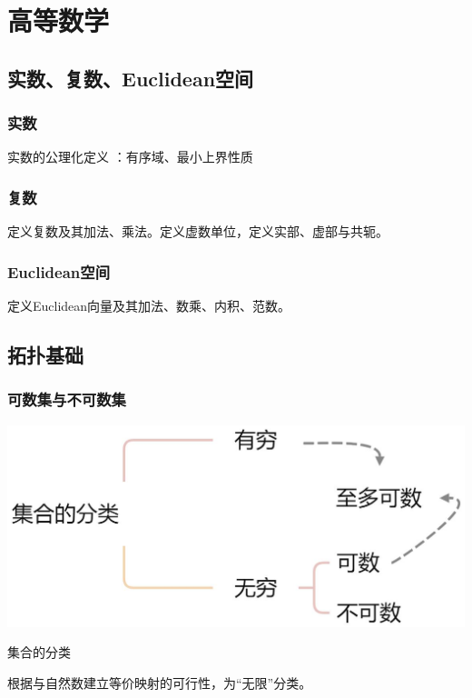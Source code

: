 \documentclass{tufte-book}
\begin{document}
\part{高等数学}

\chapter{实数、复数、Euclidean空间}

\section{实数}
实数的公理化定义
：有序域、最小上界性质
\section{复数}
\par 定义复数及其加法、乘法。定义虚数单位，定义实部、虚部与共轭。
\section{Euclidean空间}
\par 定义Euclidean向量及其加法、数乘、内积、范数。
\chapter{拓扑基础}
\section{可数集与不可数集}
\begin{marginfigure}
    \centering
    \includegraphics{可数集与不可数集.jpg}
    \caption{集合的分类}
\end{marginfigure}
根据与自然数建立等价映射的可行性，为“无限”分类。
\end{document}

